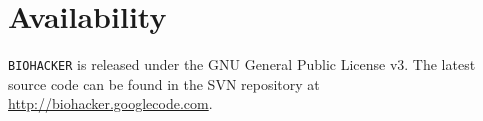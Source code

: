 \section{Availability}

{\tt BIOHACKER} is released under the GNU General Public License v3.
The latest source code can be found in the SVN repository at
\url{http://biohacker.googlecode.com}.
